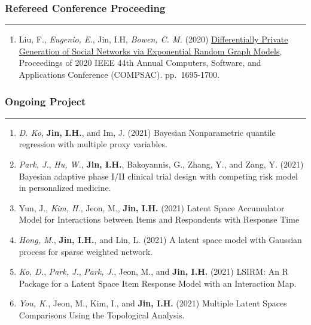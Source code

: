 \documentclass[
]{book}
\providecommand{\tightlist}{%
  \setlength{\itemsep}{0pt}\setlength{\parskip}{0pt}}
\begin{document}
\hypertarget{refereed-conference-proceeding}{%
\subsubsection*{Refereed Conference Proceeding}\label{refereed-conference-proceeding}}

\begin{center}\rule{0.5\linewidth}{0.5pt}\end{center}

\begin{enumerate}
\def\labelenumi{\arabic{enumi}.}
\tightlist
\item
  Liu, F., \emph{Eugenio, E.}, Jin, I.H, \emph{Bowen, C. M.} (2020) \href{https://www.researchgate.net/publication/345376724_Differentially_Private_Generation_of_Social_Networks_via_Exponential_Random_Graph_Models}{Differentially Private Generation of Social Networks via Exponential Random Graph Models}, Proceedings of 2020 IEEE 44th Annual Computers, Software, and Applications Conference (COMPSAC). pp.~1695-1700.
\end{enumerate}

\hypertarget{ongoing-project}{%
\subsubsection*{Ongoing Project}\label{ongoing-project}}

\begin{center}\rule{0.5\linewidth}{0.5pt}\end{center}

\begin{enumerate}
\def\labelenumi{\arabic{enumi}.}
\item
  \emph{D. Ko}, \textbf{Jin, I.H.}, and Im, J. (2021) Bayesian Nonparametric quantile regression with multiple proxy variables.
\item
  \emph{Park, J.}, \emph{Hu, W.}, \textbf{Jin, I.H.}, Bakoyannis, G., Zhang, Y., and Zang, Y. (2021) Bayesian adaptive phase I/II clinical trial design with competing risk model in personalized medicine.
\item
  Yun, J., \emph{Kim, H.}, Jeon, M., \textbf{Jin, I.H.} (2021) Latent Space Accumulator Model for Interactions between Items and Respondents with Response Time
\item
  \emph{Hong, M.}, \textbf{Jin, I.H.}, and Lin, L. (2021) A latent space model with Gaussian process for sparse weighted network.
\item
  \emph{Ko, D.}, \emph{Park, J.}, \emph{Park, J.}, Jeon, M., and \textbf{Jin, I.H.} (2021) LSIRM: An R Package for a Latent Space Item Response Model with an Interaction Map.
\item
  \emph{You, K.}, Jeon, M., Kim, I., and \textbf{Jin, I.H.} (2021) Multiple Latent Spaces Comparisons Using the Topological Analysis.
\end{enumerate}
\end{document}
